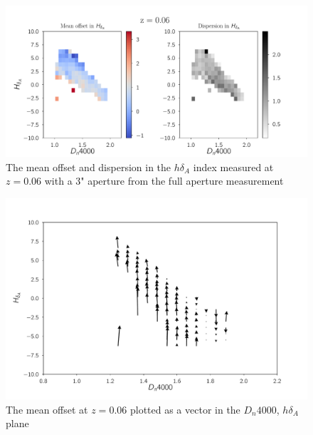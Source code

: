 \begin{figure}
\includegraphics[width=\textwidth]{figures/z6c.pdf}
\caption[Short figure name.]{ The mean offset and dispersion in the $h\delta_{A}$ index measured at $z = 0.06$ with a $3$" aperture from the full aperture measurement 
\label{fig:myInlineFigure}}
\end{figure}

\begin{figure}
\includegraphics[width=\textwidth]{figures/z6d.pdf}
\caption[Short figure name.]{ The mean offset at $z=0.06$ plotted as a vector in the $D_{n}4000$, $h\delta_{A}$ plane
\label{fig:myInlineFigure}}
\end{figure}


